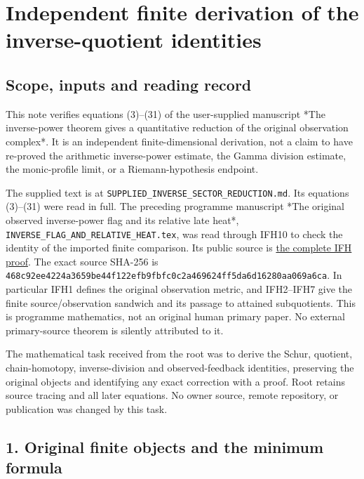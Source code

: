 \section{Independent finite derivation of the inverse-quotient identities}\label{independent-finite-derivation-of-the-inverse-quotient-identities}

\subsection{Scope, inputs and reading record}\label{scope-inputs-and-reading-record}

This note verifies equations (3)--(31) of the user-supplied manuscript *The inverse-power theorem gives a quantitative reduction of the original observation complex*. It is an independent finite-dimensional derivation, not a claim to have re-proved the arithmetic inverse-power estimate, the Gamma division estimate, the monic-profile limit, or a Riemann-hypothesis endpoint.

The supplied text is at \nolinkurl{SUPPLIED_INVERSE_SECTOR_REDUCTION.md}. Its equations (3)--(31) were read in full. The preceding programme manuscript *The original observed inverse-power flag and its relative late heat*, \nolinkurl{INVERSE_FLAG_AND_RELATIVE_HEAT.tex}, was read through IFH10 to check the identity of the imported finite comparison. Its public source is \href{https://github.com/KokunoYumeto/zeta-function-research-reader/blob/edd4008690952fb8568a01744e49ad7e180401e9/workbenches/splitzero-tandem/continuations/20260921-original-observation/INVERSE_FLAG_AND_RELATIVE_HEAT.tex}{the complete IFH proof}. The exact source SHA-256 is \nolinkurl{468c92ee4224a3659be44f122efb9fbfc0c2a469624ff5da6d16280aa069a6ca}. In particular IFH1 defines the original observation metric, and IFH2--IFH7 give the finite source/observation sandwich and its passage to attained subquotients. This is programme mathematics, not an original human primary paper. No external primary-source theorem is silently attributed to it.

The mathematical task received from the root was to derive the Schur, quotient, chain-homotopy, inverse-division and observed-feedback identities, preserving the original objects and identifying any exact correction with a proof. Root retains source tracing and all later equations. No owner source, remote repository, or publication was changed by this task.

\subsection{1. Original finite objects and the minimum formula}\label{original-finite-objects-and-the-minimum-formula}

